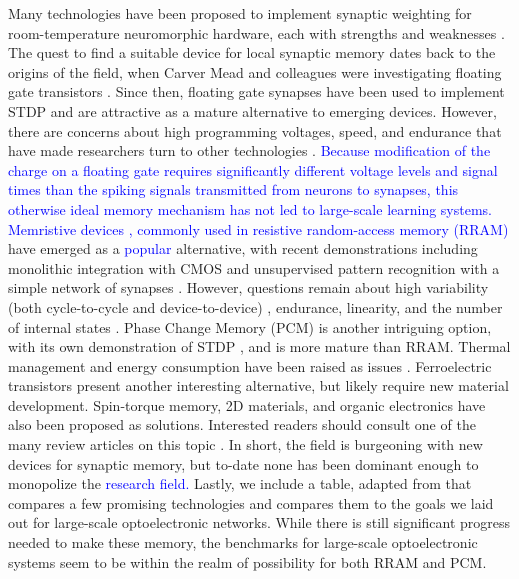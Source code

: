 \documentclass[twocolumn]{article}
\begin{document}
Many technologies have been proposed to implement synaptic weighting for room-temperature neuromorphic hardware, each with strengths and weaknesses \cite{upadhyay2019emerging}. The quest to find a suitable device for local synaptic memory dates back to the origins of the field, when Carver Mead and colleagues were investigating floating gate transistors \cite{diorio1998floating}. Since then, floating gate synapses have been used to implement STDP \cite{ramakrishnan2011floating} and are attractive as a mature alternative to emerging devices. However, there are concerns about high programming voltages, speed, and endurance that have made researchers turn to other technologies \cite{zahoor2020resistive}. \textcolor{blue}{Because modification of the charge on a floating gate requires significantly different voltage levels and signal times than the spiking signals transmitted from neurons to synapses, this otherwise ideal memory mechanism has not led to large-scale learning systems. Memristive devices \cite{stsn2008,yast2012,ab2018}, commonly used in resistive random-access memory (RRAM)} have emerged as a \textcolor{blue}{popular} alternative, with recent demonstrations including monolithic integration with CMOS \cite{yin2019monolithically} and unsupervised pattern recognition with a simple network of synapses \cite{ielmini2018brain}. However, questions remain about high variability (both cycle-to-cycle and device-to-device) \cite{dalgaty2019hybrid}, endurance, linearity, and the number of internal states \cite{zahoor2020resistive}. Phase Change Memory (PCM) is another intriguing option, with its own demonstration of STDP \cite{ambrogio2016unsupervised}, and is more mature than RRAM. Thermal management and energy consumption have been raised as issues \cite{upadhyay2019emerging, zahoor2020resistive}. Ferroelectric transistors present another interesting alternative, but likely require new material development. Spin-torque memory, 2D materials, and organic electronics have also been proposed as solutions. Interested readers should consult one of the many review articles on this topic \cite{kim2018recent, upadhyay2019emerging, zhang2020brain}. In short, the field is burgeoning with new devices for synaptic memory, but to-date none has been dominant enough to monopolize the \textcolor{blue}{research field.} Lastly, we include a table, adapted from \cite{zahoor2020resistive} that compares a few promising technologies and compares them to the goals we laid out for large-scale optoelectronic networks. While there is still significant progress needed to make these memory, the benchmarks for large-scale optoelectronic systems seem to be within the realm of possibility for both RRAM and PCM.
\end{document}
